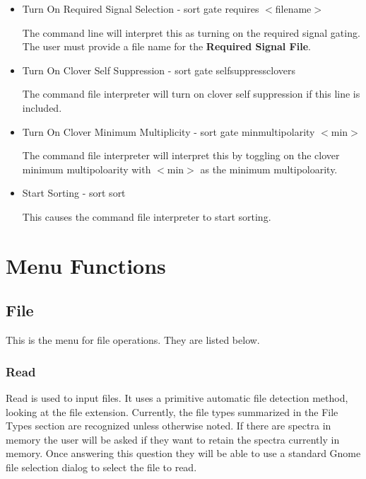 \begin{itemize}
\begin{itemize}
This line will cause the command file interpreter will turn on veto gating.  The user needs to provide a file name for a {\bf Veto Gate File}.

\item{Turn On Required Signal Selection - sort gate requires $<$filename$>$}

The command line will interpret this as turning on the required signal gating.  The user must provide a file name for the {\bf Required Signal File}.

\item{Turn On Clover Self Suppression - sort gate selfsuppressclovers}

The command file interpreter will turn on clover self suppression if this line is included.

\item{Turn On Clover Minimum Multiplicity - sort gate minmultipolarity $<$min$>$}

The command file interpreter will interpret this by toggling on the clover minimum multipoloarity with $<$min$>$ as the minimum multipoloarity.

\item{Start Sorting - sort sort}

This causes the command file interpreter to start sorting.

\end{itemize}
\end{itemize}

\chapter{Menu Functions}

\section{File}

This is the menu for file operations.  They are listed below.

\subsection{Read}

Read is used to input files.  It uses a primitive automatic file detection method, looking at the file extension.  Currently, the file types summarized in the File Types section are recognized unless otherwise noted.  If there are spectra in memory the user will be asked if they want to retain the spectra currently in memory.  Once answering this question they will be able to use a standard Gnome file selection dialog to select the file to read.

